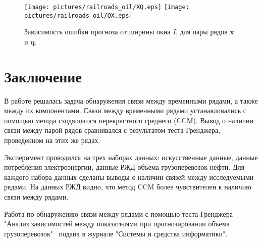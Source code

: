 \documentclass[14pt]{article}
\newcommand{\bq}{\mathbf{q}}
\newcommand{\bx}{\mathbf{x}}
\begin{document}
\begin{figure}[H]
\begin{center}
\texttt{[image: pictures/railroads\_oil/XQ.eps]}
\texttt{[image: pictures/railroads\_oil/QX.eps]}
\caption{Зависимость ошибки прогноза от ширины окна $L$ для пары рядов $\bx$ и $\bq$.}
\label{mse_railroads}
\end{center}
\end{figure}


\section{Заключение}
В работе решалась задача обнаружения связи между временными рядами, а также между их компонентами. Связи между  временными рядами устанавливались с помощью метода сходящегося перекрестного среднего (CCM). Вывод о наличии связи между парой рядов сравнивался с результатом теста Гренджера, проведенном на этих же рядах. 

Эксперимент проводился на трех наборах данных: искусственные данные, данные потребления электроэнергии, данные РЖД объема грузоперевозок нефти. Для каждого набора данных сделаны выводы о наличии связей между исследуемыми рядами. На данных РЖД видно, что метод CCM более чувствителен к наличию связи между рядами. 

Работа по обнаружению связи между рядами с помощью теста Гренджера "Анализ зависимостей между показателями при прогнозировании объема грузоперевозок" $\,$ подана в журнале  "Системы и средства информатики".











\end{document}
